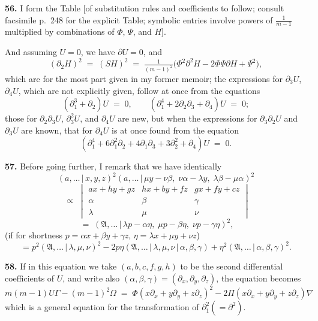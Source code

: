 \documentclass[11pt,a4paper]{article}
\providecommand{\mid}{\,|\,}
\begin{document}
\medskip

\textbf{56.} I form the Table [of substitution rules and coefficients to follow; consult facsimile p.~248 for the explicit Table; symbolic entries involve powers of $\tfrac{1}{m-1}$ multiplied by combinations of $\Phi$, $\Psi$, and $H$].

\medskip

And assuming $U = 0$, we have $\partial U = 0$, and
\[
(\partial_2 H)^2 \;=\; (SH)^2 \;=\; \tfrac{1}{(m-1)^2}\bigl(\Phi^2\partial^2 H - 2\Phi\Psi\partial H + \Psi^2\bigr),
\]
which are for the most part given in my former memoir; the expressions for $\partial_3 U$, $\partial_4 U$, which are not explicitly given, follow at once from the equations
\[
(\partial_1^3 + \partial_2)U \;=\; 0,\qquad (\partial_1^4 + 2\partial_2\partial_3 + \partial_4)U \;=\; 0;
\]
those for $\partial_2\partial_3 U$, $\partial_3^2 U$, and $\partial_4 U$ are new, but when the expressions for $\partial_3\partial_2 U$ and $\partial_3 U$ are known, that for $\partial_4 U$ is at once found from the equation
\[
(\partial_1^4 + 6\partial_1^2\partial_2 + 4\partial_1\partial_3 + 3\partial_2^2 + \partial_4)U \;=\; 0.
\]

\medskip

\textbf{57.} Before going further, I remark that we have identically
\[
(a,\ldots\mid x,y,z)^2(a,\ldots\mid \mu y - \nu\beta,\;\nu\alpha - \lambda y,\;\lambda\beta - \mu\alpha)^2
\]
\[
\;\propto\; \begin{vmatrix} ax + hy + gz & hx + by + fz & gx + fy + cz \\ \alpha & \beta & \gamma \\ \lambda & \mu & \nu \end{vmatrix}
\]
\[
\;=\; (\mathfrak{A},\ldots\mid \lambda p - \alpha\eta,\;\mu p - \beta\eta,\;\nu p - \gamma\eta)^2,
\]
(if for shortness $p = \alpha x + \beta y + \gamma z$, $\eta = \lambda x + \mu y + \nu z$)
\[
= p^2(\mathfrak{A},\ldots\mid \lambda,\mu,\nu)^2 - 2 p\eta(\mathfrak{A},\ldots\mid \lambda,\mu,\nu\mid \alpha,\beta,\gamma) + \eta^2(\mathfrak{A},\ldots\mid \alpha,\beta,\gamma)^2.
\]

\medskip

\textbf{58.} If in this equation we take $(a,b,c,f,g,h)$ to be the second differential coefficients of $U$, and write also $(\alpha,\beta,\gamma) = (\partial_x,\partial_y,\partial_z)$, the equation becomes
\[
m(m-1)U\Gamma - (m-1)^2 \Omega \;=\; \Phi(x\partial_x + y\partial_y + z\partial_z)^2 - 2\Pi(x\partial_x + y\partial_y + z\partial_z)\nabla
\]
which is a general equation for the transformation of $\partial^2_1 (= \partial^2)$.
\end{document}
